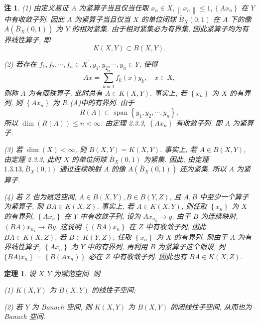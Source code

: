 \documentclass[openany]{ctexbook}
\theoremstyle{kaiti}
\newtheorem{theorem}{定理}[section]
\theoremstyle{normal}
\newtheorem{remark}{注}[section]
\begin{document}
\begin{remark}
(1) 由定义易证 $A$ 为紧算子当且仅当任取 $x_n \in X,\left\|x_n\right\| \leqslant 1,\left\{A x_n\right\}$ 在 $Y$ 中有收敛子列. 因此 $A$ 为紧算子当且仅当 $X$ 的单位闭球 $\bar{B}_{X}(0,1)$ 在 $A$ 下的像 $A\left(\bar{B}_{X}(0,1)\right)$ 为 $Y$ 的相对紧集. 由于相对紧集必为有界集, 因此紧算子均为有界线性算子, 即
$$
K(X, Y) \subset B(X, Y).
$$

(2) 若存在 $f_1, f_2, \cdots, f_n \in X^{\prime}, y_1, y_2, \cdots, y_n \in Y$, 使得
$$
A x=\sum_{k=1}^n f_{k}(x) y_{k}, \quad x \in X,
$$
则称 $A$ 为有限秩算子. 此时总有 $A \in K(X, Y)$. 事实上, 若 $\left\{x_n\right\}$ 为 $X$ 的有界列, 则 $\left\{A x_n\right\}$ 为 $R$ (A)中的有界列. 由于
$$
R(A) \subset \operatorname{span}\left\{y_1, y_2, \cdots, y_n\right\},
$$
所以 $\operatorname{dim}(R(A)) \leqslant n<\infty$. 由定理 2.3.3, $\left\{A x_n\right\}$ 有收敛子列. 即 $A$ 为紧算子.

(3) 若 $\operatorname{dim}(X)<\infty$, 则 $B(X, Y)=K(X, Y)$. 事实上, 若 $A \in B(X, Y)$, 由定理 2.3.3, 此时 $X$ 的单位闭球 $\bar{B}_{X}(0,1)$ 为紧集. 因此, 由定理 $1.3.13, \bar{B}_{X}(0,1)$ 通过连续映射 $A$ 的像 $A\left(\bar{B}_{X}(0,1)\right)$ 还为紧集. 所以 $A$ 为紧算子.

(4) 若 $Z$ 也为赋范空间, $A \in B(X, Y), B \in B(Y, Z)$, 且 $A, B$ 中至少一个算子为紧算子, 则 $B A \in K(X, Z)$. 事实上, 若 $A \in K(X, Y)$, 则任取 $\left\{x_n\right\}$ 为 $X$ 的有界列, $\left\{A x_n\right\}$ 在 $Y$ 中有收敛子列, 设为 $A x_{n_{k}} \rightarrow y$. 由于 $B$ 为连续映射, $(B A) x_{n_{k}} \rightarrow B y$. 这说明 $\left\{(B A) x_n\right\}$ 在 $Z$ 中有收敛子列, 因此 $B A \in K(X, Z)$. 若 $B \in K(Y, Z)$, 任取 $\left\{x_n\right\}$ 为 $X$ 的有界列. 则由于 $A$ 为有界线性算子, $\left\{A x_n\right\}$ 为 $Y$ 中的有界列, 再利用 $B$ 为紧算子这个假设, 列 $\left.\{B A) x_n\right\}=\left\{B\left(A x_n\right)\right\}$ 必在 $Z$ 中有收敛子列. 因此也有 $B A \in K(X, Z)$.
\end{remark}

\begin{theorem}
设 $X, Y$ 为赋范空间. 则

(1) $K(X, Y)$ 为 $B(X, Y)$ 的线性子空间;

(2) 若 $Y$ 为 Banach 空间, 则 $K(X, Y)$ 为 $B(X, Y)$ 的闭线性子空间, 从而也为 Banach 空间. 
\end{theorem}
\end{document}
